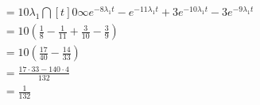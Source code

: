 \documentclass[dvipdfmx,titlepage, 11pt, a4paper]{jsarticle}%
\begin{document}
\begin{enumerate}[(1)]
\begin{align*}
            &= 10\lambda_1 \dint[t]{0}{\infty}{e^{-8\lambda_1 t} - e^{-11\lambda_1 t} + 3e^{-10\lambda_1 t} - 3e^{-9\lambda_1 t}}\\
            &= 10\left(\frac{1}{8} - \frac{1}{11} + \frac{3}{10} - \frac{3}{9}\right)\\
            &= 10\left(\frac{17}{40} - \frac{14}{33}\right)\\
            &= \frac{17\cdot 33 - 140 \cdot 4}{132}\\
            &= \frac{1}{132}
        \end{align*}
\end{enumerate}
{}
\end{document}

